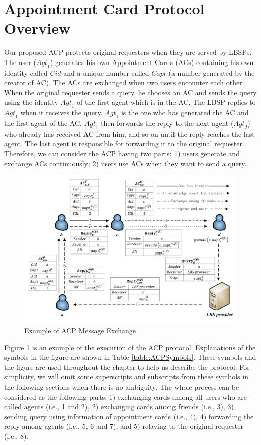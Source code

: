 \section{Appointment Card Protocol Overview}

\noindent Our proposed ACP protects original requesters when they are served by LBSPs. The user (${Agt}_{1}$) generates his own Appointment Cards (ACs) containing his own identity called $Cid$ and a unique number called $Capt$ (a number generated by the creator of AC). The ACs are exchanged when two users encounter each other. When the original requester sends a query, he chooses an AC and sends the query using the identity ${Agt}_{1}$ of the first agent which is in the AC. The LBSP replies to ${Agt}_{1}$ when it receives the query. ${Agt}_{1}$ is the one who has generated the AC and the first agent of the AC. ${Agt}_{1}$ then forwards the reply to the next agent (${Agt}_{2}$) who already has received AC from him, and so on until the reply reaches the last agent. The last agent is responsible for forwarding it to the original requester. Therefore, we can consider the ACP having two parts: 1) users generate and exchange ACs continuously; 2) users use ACs when they want to send a query.

\begin{figure} [H]
\centering 
\includegraphics[width=6.0in]{figures/FIG_4_1_Example_of_ACP_Message_Exchange.png}
\caption{Example of ACP Message Exchange} 
\label{fig:EoACPME} %
\end{figure}


Figure \ref{fig:EoACPME} is an example of the execution of the ACP protocol. Explanations of the symbols in the figure are shown in Table \ref{table:ACPSymbols}. These symbols and the figure are used throughout the chapter to help us describe the protocol. For simplicity, we will omit some superscripts and subscripts from these symbols in the following sections when there is no ambiguity. The whole process can be considered as the following parts: 1) exchanging cards among all users who are called agents (i.e., 1 and 2), 2) exchanging cards among friends (i.e., 3), 3) sending query using information of appointment cards (i.e., 4), 4) forwarding the reply among agents (i.e., 5, 6 and 7), and 5) relaying to the original requester (i.e., 8). 


